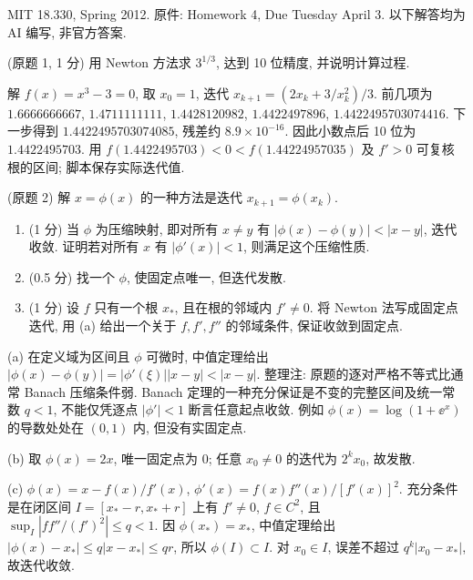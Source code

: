 MIT 18.330, Spring 2012. 原件: Homework 4, Due Tuesday April 3. 以下解答均为 AI 编写, 非官方答案.

\begin{exercise}\label{ps4-q1}
(原题 1, 1 分) 用 Newton 方法求 $3^{1/3}$, 达到 10 位精度, 并说明计算过程.
\end{exercise}
\begin{solution}
解 $f(x)=x^3-3=0$, 取 $x_0=1$, 迭代
$x_{k+1}=(2x_k+3/x_k^2)/3$. 前几项为
$1.6666666667$, $1.4711111111$, $1.4428120982$, $1.4422497896$,
$1.4422495703074416$. 下一步得到 $1.4422495703074085$, 残差约 $8.9\times10^{-16}$. 因此小数点后 10 位为 $1.4422495703$. 用 $f(1.4422495703)<0<f(1.44224957035)$ 及 $f'>0$ 可复核根的区间; 脚本保存实际迭代值.
\end{solution}

\begin{exercise}\label{ps4-q2}
(原题 2) 解 $x=\phi(x)$ 的一种方法是迭代 $x_{k+1}=\phi(x_k)$.
\begin{enumerate}[label=(\alph*)]
\item (1 分) 当 $\phi$ 为压缩映射, 即对所有 $x\ne y$ 有
$|\phi(x)-\phi(y)|<|x-y|$, 迭代收敛. 证明若对所有 $x$ 有 $|\phi'(x)|<1$, 则满足这个压缩性质.
\item (0.5 分) 找一个 $\phi$, 使固定点唯一, 但迭代发散.
\item (1 分) 设 $f$ 只有一个根 $x_*$, 且在根的邻域内 $f'\ne0$. 将 Newton 法写成固定点迭代, 用 (a) 给出一个关于 $f,f',f''$ 的邻域条件, 保证收敛到固定点.
\end{enumerate}
\end{exercise}
\begin{solution}
(a) 在定义域为区间且 $\phi$ 可微时, 中值定理给出
$|\phi(x)-\phi(y)|=|\phi'(\xi)||x-y|<|x-y|$.
整理注: 原题的逐对严格不等式比通常 Banach 压缩条件弱. Banach 定理的一种充分保证是不变的完整区间及统一常数 $q<1$, 不能仅凭逐点 $|\phi'|<1$ 断言任意起点收敛. 例如 $\phi(x)=\log(1+\ee^x)$ 的导数处处在 $(0,1)$ 内, 但没有实固定点.

(b) 取 $\phi(x)=2x$, 唯一固定点为 $0$; 任意 $x_0\ne0$ 的迭代为 $2^kx_0$, 故发散.

(c) $\phi(x)=x-f(x)/f'(x)$,
$\phi'(x)=f(x)f''(x)/[f'(x)]^2$. 充分条件是在闭区间
$I=[x_*-r,x_*+r]$ 上有 $f'\ne0$, $f\in C^2$, 且
$\sup_I|ff''/(f')^2|\le q<1$. 因 $\phi(x_*)=x_*$, 中值定理给出
$|\phi(x)-x_*|\le q|x-x_*|\le qr$, 所以 $\phi(I)\subset I$.
对 $x_0\in I$, 误差不超过 $q^k|x_0-x_*|$, 故迭代收敛.
\end{solution}

